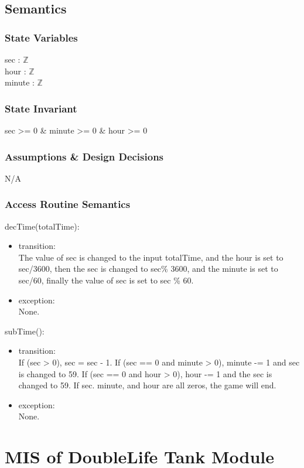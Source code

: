 \documentclass[12pt, titlepage]{article}
\begin{document}
		\subsection{Semantics}
		\subsubsection{State Variables}
		sec : $\mathbb{Z}$\\
		hour : $\mathbb{Z}$\\
		minute : $\mathbb{Z}$
		
		\subsubsection{State Invariant}
		sec >= 0 \& minute >= 0 \& hour >= 0
		
		\subsubsection{Assumptions \& Design Decisions}
		N/A
		\subsubsection{Access Routine Semantics}
		decTime(totalTime):
		\begin{itemize}
		\item transition:\\ The value of sec is changed to the input totalTime, and the hour is set to sec/3600, then the sec is changed to sec\% 3600, and the minute is set to sec/60, finally the value of sec is set to sec \% 60.
		
		\item exception:\\ None.
		\end{itemize}
	    subTime():
	    \begin{itemize}
	    \item transition:\\ If (sec > 0), sec = sec - 1. If (sec == 0 and minute > 0), minute -= 1 and sec is changed to 59. If (sec == 0 and hour > 0), hour -= 1 and the sec is changed to 59. If sec. minute, and hour are all zeros, the game will end.
	    
	    \item exception:\\ None.
	    \end{itemize}
	        
\section{MIS of DoubleLife Tank Module}
\end{document}
